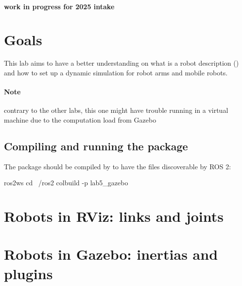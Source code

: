 \documentclass{ecnreport}
\author{O. Kermorgant}
\begin{document}


\paragraph{work in progress for 2025 intake}

\section{Goals}

This lab aims to have a better understanding on what is a robot description () and how to set up a dynamic simulation for robot arms and mobile robots.

\paragraph{Note} contrary to the other labs, this one might have trouble running in a virtual machine due to the computation load from Gazebo

\subsection*{Compiling and running the package}

The package should be compiled by  to have the files discoverable by ROS 2:
\begin{bashcodelarge}
 ros2ws
 cd ~/ros2
 colbuild -p lab5_gazebo
\end{bashcodelarge}


\section{Robots in RViz: links and joints}


\section{Robots in Gazebo: inertias and plugins}
\end{document}
